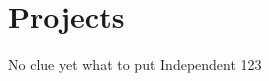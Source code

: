 \section*{Projects}
\begin{entrylist}
  \entry
    {}
    {No clue yet what to put}
    {Independent}
    {123}
\end{entrylist}
